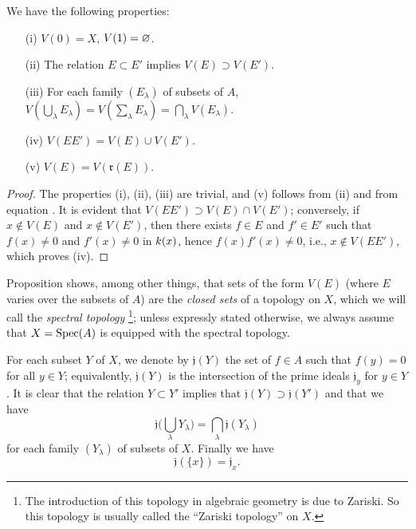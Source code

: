 \begin{proposition}[1.1.2]
\label{I.1.1.2}
We have the following properties:
\begin{enumerate}
  \item[{\rm(i)}] $V(0)=X$, $V(1)=\varnothing$.
  \item[{\rm(ii)}] The relation $E\subset E'$ implies $V(E)\supset V(E')$.
  \item[{\rm(iii)}] For each family $(E_\lambda)$ of subsets of $A$, $V(\bigcup_\lambda E_\lambda)=V(\sum_\lambda E_\lambda)=\bigcap_\lambda V(E_\lambda)$.
  \item[{\rm(iv)}] $V(EE')=V(E)\cup V(E')$.
  \item[{\rm(v)}] $V(E)=V(\mathfrak{r}(E))$.
\end{enumerate}
\end{proposition}

\begin{proof}
\label{proof-I.1.1.2}
The properties (i), (ii), (iii) are trivial, and (v) follows from (ii) and from equation .
It is evident that $V(EE')\supset V(E)\cap V(E')$;
conversely, if $x\not\in V(E)$ and $x\not\in V(E')$, then there exists $f\in E$ and $f'\in E'$ such that $f(x)\neq 0$ and $f'(x)\neq 0$ in $k(x)$, hence $f(x)f'(x)\neq 0$, i.e., $x\not\in V(EE')$, which proves (iv).
\end{proof}

Proposition  shows, among other things, that sets of the form $V(E)$ (where $E$ varies over the subsets of $A$) are the \emph{closed sets} of a topology on $X$, which we will call the \emph{spectral topology}
\footnote{The introduction of this topology in algebraic geometry is due to Zariski.
So this topology is usually called the ``Zariski topology'' on $X$.};
unless expressly stated otherwise, we always assume that $X=\operatorname{Spec}(A)$ is equipped with the spectral topology.

\begin{env}[1.1.3]
\label{I.1.1.3}
For each subset $Y$ of $X$, we denote by $\mathfrak{j}(Y)$ the set of $f\in A$ such that $f(y)=0$ for all $y\in Y$;
equivalently, $\mathfrak{j}(Y)$ is the intersection of the prime ideals $\mathfrak{j}_y$ for $y\in Y$.
It is clear that the relation $Y\subset Y'$ implies that $\mathfrak{j}(Y)\supset\mathfrak{j}(Y')$ and that we have
\[
  \mathfrak{j}\bigg(\bigcup_\lambda Y_\lambda\bigg)=\bigcap_\lambda\mathfrak{j}(Y_\lambda)
  \tag{1.1.3.1}
\]
for each family $(Y_\lambda)$ of subsets of $X$.
Finally we have
\[
  \mathfrak{j}(\{x\})=\mathfrak{j}_x.
  \tag{1.1.3.2}
\]
\end{env}

